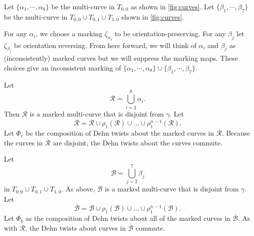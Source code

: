 
Let $\{\alpha_1,\cdots,\alpha_8\}$ be the multi-curve in $T_{0,0}$ as shown in \autoref{fig:curves}.  Let $\{\beta_1,\cdots,\beta_7\}$ be the multi-curve in $T_{0,0}\cup T_{0,1}\cup T_{1,0}$ shown in \autoref{fig:curves}. %

For any $\alpha_i$, we choose a marking $\zeta_{\alpha_i}$ to be orientation-preserving.  For any $\beta_j$ let $\zeta_{\beta_j}$ be
orientation reversing. From here forward, we will think of $\alpha_i$ and $\beta_j$ as (inconsistently) marked curves but we will suppress the marking maps. These choices give an inconsistent marking of $\{\alpha_1,\cdots,\alpha_8\}\cup\{\beta_1,\cdots,\beta_7\}$.

Let
$$\mathcal{R}=\displaystyle\bigcup_{i=2}^8\alpha_i.$$ Then $\mathcal{R}$ is a marked multi-curve that is disjoint from $\gamma$.  Let
$$\overline{\mathcal{R}}= \mathcal{R} \cup \rho_1(\mathcal{R}) \cup \dots \cup
\rho_1^{n-1}(\mathcal{R}).$$
Let $\Phi_r$ be the composition of Dehn twists about the marked curves in $\overline{\mathcal{R}}$.  Because the curves in $\overline{\mathcal{R}}$ are disjoint, the Dehn twists about the curves commute.

Let $$\mathcal{B}=\displaystyle\bigcup_{j=2}^7\beta_j$$ in $T_{0,0} \cup T_{0,1} \cup T_{1,0}$. As above, $\mathcal{B}$ is a marked multi-curve that is disjoint from $\gamma$.  Let $$\overline{\mathcal{B}} = \mathcal{B} \cup \rho_1(\mathcal{B}) \cup \dots \cup
\rho_1^{n-1}(\mathcal{B}).$$
Let $\Phi_b$
as the composition of Dehn twists about all of the marked curves in $\overline{\mathcal{B}}$.
As with $\overline{\mathcal{R}}$, the Dehn twists about curves in $\overline{\mathcal{B}}$
commute.




